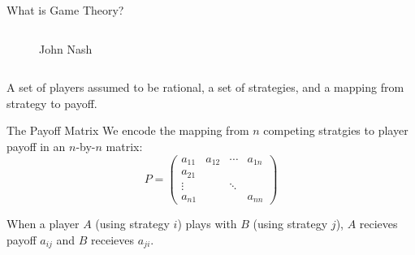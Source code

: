 \documentclass{beamer}
\begin{document}
\begin{frame}[c]{What is Game Theory?}
\begin{columns}[c]
\begin{column}{.5\textwidth}
\begin{figure}
      \small{John Nash}
    \end{figure}
  \end{column}
\end{columns}
\begin{block}{}
A set of players assumed to be rational, a set of strategies, and a mapping from strategy to payoff.
\end{block}
\end{frame}

\begin{frame}[c]{The Payoff Matrix}
We encode the mapping from $n$ competing stratgies to player payoff in an $n$-by-$n$ matrix:
\[
    P = 
    \begin{pmatrix}
      a_{11} & a_{12} & \cdots & a_{1n} \\
      a_{21} & & & \\
      \vdots & & \ddots & \\
      a_{n1} & & & a_{nn}
    \end{pmatrix}
\]
\begin{block}{}
  When a player $A$ (using strategy $i$) plays with $B$ (using strategy $j$), $A$ recieves payoff $a_{ij}$ and $B$ receieves $a_{ji}$.
\end{block}
\end{frame}
\end{document}
